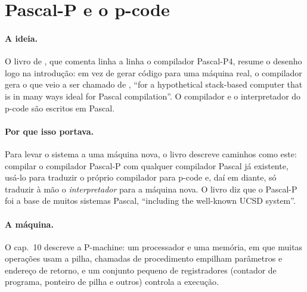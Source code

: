 \section{Pascal-P e o p-code}
\label{sec:hist-pcode}

\paragraph{A ideia.}
O livro de \textcite{livro:pemberton1982}, que comenta linha a linha o
compilador Pascal-P4, resume o desenho logo na introdução: em vez de
gerar código para uma máquina real, o compilador gera o que veio a ser
chamado de , \enquote{for a
hypothetical stack-based computer that is in many ways ideal for Pascal
compilation}. O compilador e o interpretador do p-code são escritos em
Pascal.

\paragraph{Por que isso portava.}
Para levar o sistema a uma máquina nova, o livro descreve caminhos como
este: compilar o compilador Pascal-P com qualquer compilador Pascal já
existente, usá-lo para traduzir o próprio compilador para p-code e, daí
em diante, só traduzir à mão o \emph{interpretador} para a máquina nova.
O livro diz que o Pascal-P foi a base de muitos sistemas Pascal,
\enquote{including the well-known UCSD system}.

\paragraph{A máquina.}
O cap.~10 descreve a P-machine: um processador e uma memória, em que
muitas operações usam a pilha, chamadas de procedimento empilham
parâmetros e endereço de retorno, e um conjunto pequeno de registradores
(contador de programa, ponteiro de pilha e outros) controla a execução.

